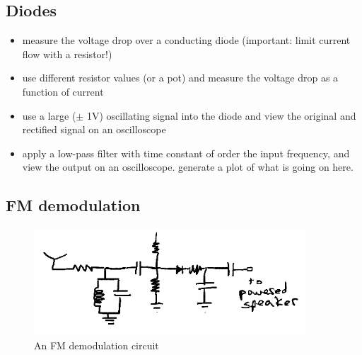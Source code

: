 \documentclass[11pt]{article}
\begin{document}
\subsection{Diodes}

\begin{itemize}[noitemsep,nolistsep]
\item measure the voltage drop over a conducting diode (important: limit current flow with a resistor!)
\item use different resistor values (or a pot) and measure the voltage drop as a function of current
\item use a large ($\pm$ 1V) oscillating signal into the diode and view the original and rectified 
signal on an oscilloscope
\item apply a low-pass filter with time constant of order the input frequency, and view the 
output on an oscilloscope.  generate a plot of what is going on here.
\end{itemize}

\subsection{FM demodulation}
\begin{figure}[h]
\centering
\includegraphics[width=4in]{plots/fm_demodulation.png}
\caption{An FM demodulation circuit}\label{fig:fm_demodulation}
\end{figure}
\end{document}

